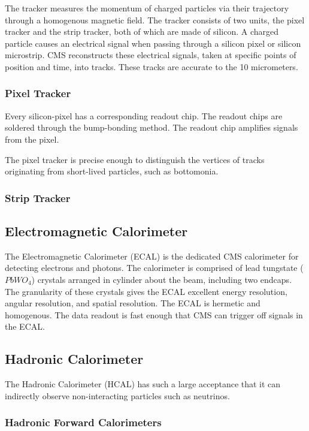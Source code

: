 The tracker measures the momentum of charged particles via their trajectory through a homogenous magnetic field. The tracker consists of two units, the pixel tracker and the strip tracker, both of which are made of silicon. A charged particle causes an electrical signal when passing through a silicon pixel or silicon microstrip. CMS reconstructs these electrical signals, taken at specific points of position and time, into tracks. These tracks are accurate to the 10 micrometers. 

\subsubsection{Pixel Tracker}

Every silicon-pixel has a corresponding readout chip. The readout chips are soldered through the bump-bonding method. The readout chip amplifies signals from the pixel.

The pixel tracker is precise enough to distinguish the vertices of tracks originating from short-lived particles, such as bottomonia. 

\subsubsection{Strip Tracker}

\subsection{Electromagnetic Calorimeter}

The Electromagnetic Calorimeter (ECAL) is the dedicated CMS calorimeter for detecting electrons and photons. The calorimeter is comprised of lead tungstate ($PbWO_4$) crystals arranged in cylinder about the beam, including two endcaps. The granularity of these crystals gives the ECAL excellent energy resolution, angular resolution, and spatial resolution. The ECAL is hermetic and homogenous. The data readout is fast enough that CMS can trigger off signals in the ECAL.
 
\subsection{Hadronic Calorimeter}

The Hadronic Calorimeter (HCAL) has such a large acceptance that it can indirectly observe non-interacting particles such as neutrinos.


\subsubsection{Hadronic Forward Calorimeters}

